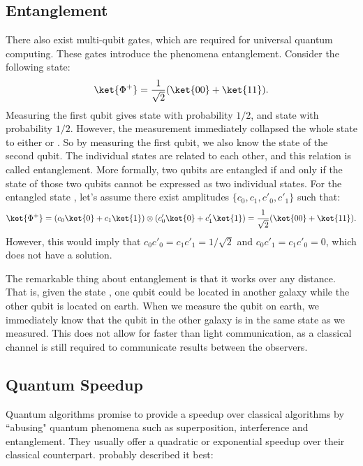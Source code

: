 \documentclass[a4paper,10pt]{article}
\begin{document}
\subsection{Entanglement} \label{sec:entanglement}
There also exist multi-qubit gates, which are required for universal quantum computing.
These gates introduce the phenomena entanglement.
Consider the following state:
\begin{equation}
\ket{\Phi^+} = \dfrac{1}{\sqrt2}(\ket{00} + \ket{11}).
\end{equation}
Measuring the first qubit gives state  with probability $1/2$, and state  with probability $1/2$.
However, the measurement immediately collapsed the whole state to either  or .
So by measuring the first qubit, we also know the state of the second qubit.
The individual states are related to each other, and this relation is called entanglement.
More formally, two qubits are entangled if and only if the state of those two qubits cannot be expressed as two individual states.
For the entangled state \ket{\Phi^+}, let's assume there exist amplitudes $\{c_0,c_1,c'_0, c'_1\}$ such that:
\begin{equation}
\ket{\Phi^+} = (c_0\ket{0} + c_1\ket{1}) \otimes (c'_0\ket{0} + c'_1\ket{1}) = \dfrac{1}{\sqrt2}(\ket{00} + \ket{11}).
\end{equation}
However, this would imply that $c_0c'_0 = c_1c'_1 = 1/\sqrt2$ and $c_0c'_1 = c_1c'_0 = 0$, which does not have a solution.

The remarkable thing about entanglement is that it works over any distance.
That is, given the state \ket{\Phi^+}, one qubit could be located in another galaxy while the other qubit is located on earth.
When we measure the qubit on earth, we immediately know that the qubit in the other galaxy is in the same state as we measured.
This does not allow for faster than light communication, as a classical channel is still required to communicate results between the observers.

\subsection{Quantum Speedup}
Quantum algorithms promise to provide a speedup over classical algorithms by ``abusing" quantum phenomena such as superposition, interference and entanglement.
They usually offer a quadratic or exponential speedup over their classical counterpart.
\cite{scott-aaronson-qc} probably described it best:
\end{document}
